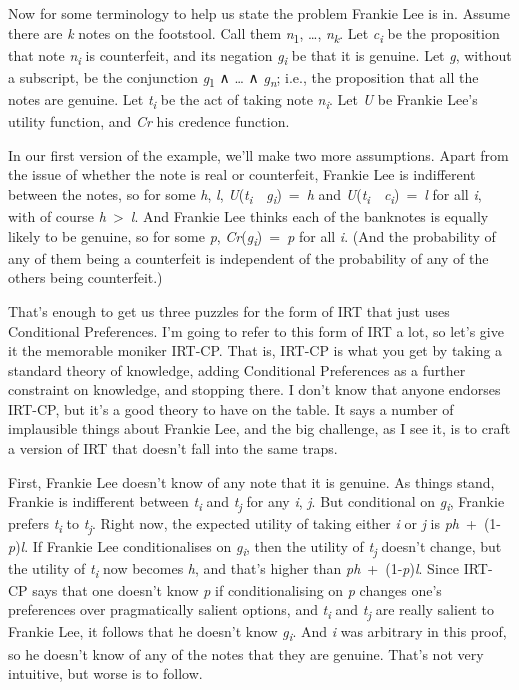 \documentclass[
  12pt,
  letterpaper,
]{scrbook}
\begin{document}
Now for some terminology to help us state the problem Frankie Lee is in.
Assume there are \emph{k} notes on the footstool. Call them
\emph{n}\textsubscript{1}, \ldots, \emph{n\textsubscript{k}}. Let
\emph{c\textsubscript{i}} be the proposition that note
\emph{n\textsubscript{i}} is counterfeit, and its negation
\emph{g\textsubscript{i}} be that it is genuine. Let \emph{g}, without a
subscript, be the conjunction \emph{g}\textsubscript{1} ∧ \ldots{} ∧
\emph{g\textsubscript{n}}; i.e., the proposition that all the notes are
genuine. Let \emph{t\textsubscript{i}} be the act of taking note
\emph{n\textsubscript{i}}. Let \emph{U} be Frankie Lee's utility
function, and \emph{Cr} his credence function.

In our first version of the example, we'll make two more assumptions.
Apart from the issue of whether the note is real or counterfeit, Frankie
Lee is indifferent between the notes, so for some \emph{h}, \emph{l},
\emph{U}(\emph{t\textsubscript{i}}~\textbar~\emph{g\textsubscript{i}})~=~\emph{h}
and
\emph{U}(\emph{t\textsubscript{i}}~\textbar~\emph{c\textsubscript{i}})~=~\emph{l}
for all \emph{i}, with of course \emph{h}~\textgreater~\emph{l}. And
Frankie Lee thinks each of the banknotes is equally likely to be
genuine, so for some \emph{p},
\emph{Cr}(\emph{g\textsubscript{i}})~=~\emph{p} for all \emph{i}. (And
the probability of any of them being a counterfeit is independent of the
probability of any of the others being counterfeit.)

That's enough to get us three puzzles for the form of IRT that just uses
Conditional Preferences. I'm going to refer to this form of IRT a lot,
so let's give it the memorable moniker IRT-CP. That is, IRT-CP is what
you get by taking a standard theory of knowledge, adding Conditional
Preferences as a further constraint on knowledge, and stopping there. I
don't know that anyone endorses IRT-CP, but it's a good theory to have
on the table. It says a number of implausible things about Frankie Lee,
and the big challenge, as I see it, is to craft a version of IRT that
doesn't fall into the same traps.

First, Frankie Lee doesn't know of any note that it is genuine. As
things stand, Frankie is indifferent between \emph{t\textsubscript{i}}
and \emph{t\textsubscript{j}} for any \emph{i}, \emph{j}. But
conditional on \emph{g\textsubscript{i}}, Frankie prefers
\emph{t\textsubscript{i}} to \emph{t\textsubscript{j}}. Right now, the
expected utility of taking either \emph{i} or \emph{j} is
\emph{ph}~+~(1-\emph{p})\emph{l}. If Frankie Lee conditionalises on
\emph{g\textsubscript{i}}, then the utility of \emph{t\textsubscript{j}}
doesn't change, but the utility of \emph{t\textsubscript{i}} now becomes
\emph{h}, and that's higher than \emph{ph}~+~(1-\emph{p})\emph{l}. Since
IRT-CP says that one doesn't know \emph{p} if conditionalising on
\emph{p} changes one's preferences over pragmatically salient options,
and \emph{t\textsubscript{i}} and \emph{t\textsubscript{j}} are really
salient to Frankie Lee, it follows that he doesn't know
\emph{g\textsubscript{i}}. And \emph{i} was arbitrary in this proof, so
he doesn't know of any of the notes that they are genuine. That's not
very intuitive, but worse is to follow.
\end{document}
